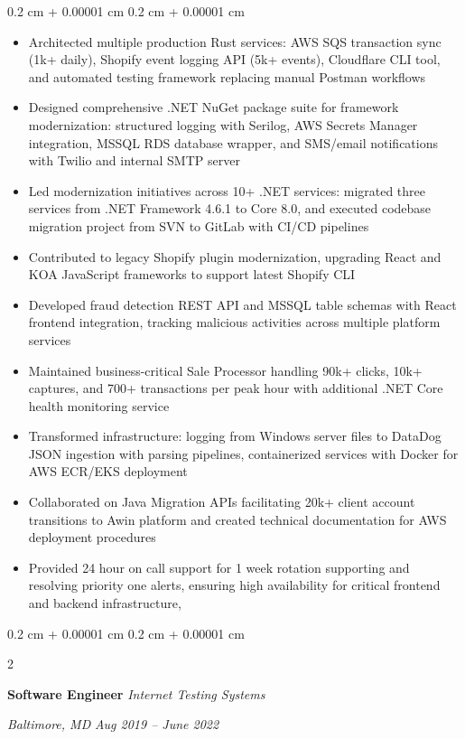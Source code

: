 \documentclass[10pt, letterpaper]{article}
\newenvironment{highlights}{
    \begin{itemize}[
        topsep=0.10 cm,
        parsep=0.10 cm,
        partopsep=0pt,
        itemsep=0pt,
        leftmargin=0.4 cm + 10pt
        ]
    }{
\end{itemize}
} %
\newenvironment{onecolentry}{
    \begin{adjustwidth}{
            0.2 cm + 0.00001 cm
        }{
            0.2 cm + 0.00001 cm
        }
    }{
    \end{adjustwidth}
} %
\newenvironment{twocolentry}[2][]{
    \onecolentry
    \def\secondColumn{#2}
    \setcolumnwidth{\fill, 10.5 cm}
    \begin{paracol}{2}
    }{
        \switchcolumn \raggedleft \secondColumn
    \end{paracol}
    \endonecolentry
} %
\begin{document}
\begin{onecolentry}
    \begin{highlights}
        \item Architected multiple production Rust services: AWS SQS transaction sync (1k+ daily), Shopify event logging API (5k+ events), Cloudflare CLI tool, and automated testing framework replacing manual Postman workflows
        \item Designed comprehensive .NET NuGet package suite for framework modernization: structured logging with Serilog, AWS Secrets Manager integration, MSSQL RDS database wrapper, and SMS/email notifications with Twilio and internal SMTP server
        \item Led modernization initiatives across 10+ .NET services: migrated three services from .NET Framework 4.6.1 to Core 8.0, and executed codebase migration project from SVN to GitLab with CI/CD pipelines
        \item Contributed to legacy Shopify plugin modernization, upgrading React and KOA JavaScript frameworks to support latest Shopify CLI
        \item Developed fraud detection REST API and MSSQL table schemas with React frontend integration, tracking malicious activities across multiple platform services
        \item Maintained business-critical Sale Processor handling 90k+ clicks, 10k+ captures, and 700+ transactions per peak hour with additional .NET Core health monitoring service
        \item Transformed infrastructure: logging from Windows server files to DataDog JSON ingestion with parsing pipelines, containerized services with Docker for AWS ECR/EKS deployment
        \item Collaborated on Java Migration APIs facilitating 20k+ client account transitions to Awin platform and created technical documentation for AWS deployment procedures
        \item Provided 24 hour on call support for 1 week rotation supporting and resolving priority one alerts, ensuring high availability for critical frontend and backend infrastructure,
    \end{highlights}
\end{onecolentry}
    \vspace{0.2 cm}
    \begin{twocolentry}{
            \textit{Baltimore, MD}
        \textit{Aug 2019 – June 2022}}
        \textbf{Software Engineer}
        \newline
        \textit{Internet Testing Systems}
    \end{twocolentry}
\end{document}
